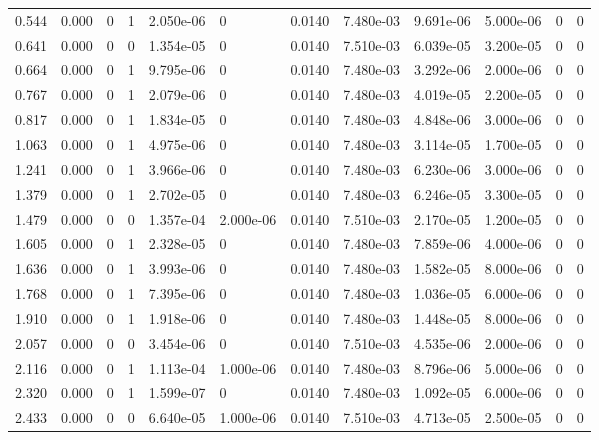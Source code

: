 \documentclass[preview]{standalone}
\begin{document}
{{\begin{tabular}{L{1.2cm}C{1.2cm} C{0.3cm}C{0.5cm} C{1.4cm}C{1.4cm} C{1.4cm}C{1.4cm} C{1.6cm}C{1.6cm} C{1.6cm}C{1.6cm}}
  0.544  &  0.000  & 0     &  1 &  2.050e-06  & 0  &  0.0140&   7.480e-03& 9.691e-06 & 5.000e-06   &  0 & 0  \\ 
  0.641  &  0.000  & 0     &  0 &  1.354e-05  & 0  &  0.0140&   7.510e-03& 6.039e-05 & 3.200e-05   &  0 & 0  \\ 
  0.664  &  0.000  & 0     &  1 &  9.795e-06  & 0  &  0.0140&   7.480e-03& 3.292e-06 & 2.000e-06   &  0 & 0  \\ 
  0.767  &  0.000  & 0     &  1 &  2.079e-06  & 0  &  0.0140&   7.480e-03& 4.019e-05 & 2.200e-05   &  0 & 0  \\ 
  0.817  &  0.000  & 0     &  1 &  1.834e-05  & 0  &  0.0140&   7.480e-03& 4.848e-06 & 3.000e-06   &  0 & 0  \\ 
  1.063  &  0.000  & 0     &  1 &  4.975e-06  & 0  &  0.0140&   7.480e-03& 3.114e-05 & 1.700e-05   &  0 & 0  \\ 
  1.241  &  0.000  & 0     &  1 &  3.966e-06  & 0  &  0.0140&   7.480e-03& 6.230e-06 & 3.000e-06   &  0 & 0  \\ 
  1.379  &  0.000  & 0     &  1 &  2.702e-05  & 0  &  0.0140&   7.480e-03& 6.246e-05 & 3.300e-05   &  0 & 0  \\ 
  1.479  &  0.000  & 0     &  0 &  1.357e-04  & 2.000e-06  &  0.0140&   7.510e-03& 2.170e-05 & 1.200e-05   &  0 & 0  \\ 
  1.605  &  0.000  & 0     &  1 &  2.328e-05  & 0  &  0.0140&   7.480e-03& 7.859e-06 & 4.000e-06   &  0 & 0  \\ 
  1.636  &  0.000  & 0     &  1 &  3.993e-06  & 0  &  0.0140&   7.480e-03& 1.582e-05 & 8.000e-06   &  0 & 0  \\ 
  1.768  &  0.000  & 0     &  1 &  7.395e-06  & 0  &  0.0140&   7.480e-03& 1.036e-05 & 6.000e-06   &  0 & 0  \\ 
  1.910  &  0.000  & 0     &  1 &  1.918e-06  & 0  &  0.0140&   7.480e-03& 1.448e-05 & 8.000e-06   &  0 & 0  \\ 
  2.057  &  0.000  & 0     &  0 &  3.454e-06  & 0  &  0.0140&   7.510e-03& 4.535e-06 & 2.000e-06   &  0 & 0  \\ 
  2.116  &  0.000  & 0     &  1 &  1.113e-04  & 1.000e-06  &  0.0140&   7.480e-03& 8.796e-06 & 5.000e-06   &  0 & 0  \\ 
  2.320  &  0.000  & 0     &  1 &  1.599e-07  & 0  &  0.0140&   7.480e-03& 1.092e-05 & 6.000e-06   &  0 & 0  \\ 
  2.433  &  0.000  & 0     &  0 &  6.640e-05  & 1.000e-06  &  0.0140&   7.510e-03& 4.713e-05 & 2.500e-05   &  0 & 0  \\ 

\end{tabular}}}
\end{document}
